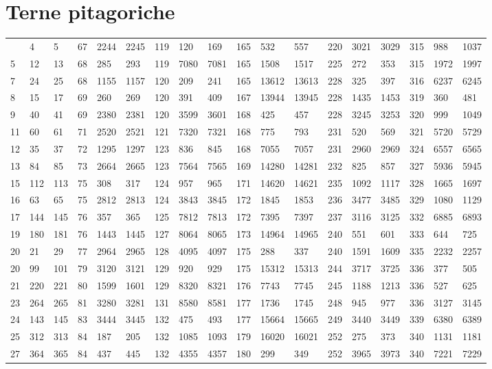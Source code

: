 \section{Terne pitagoriche}
\begin{center}
\footnotesize
\begin{longtable}{*5{A@{\hspace*{5mm}}A}}
	\toprule\endhead
\bottomrule {}&4&5&67&2244&2245&119&120&169&165&532&557&220&3021&3029&315&988&1037\\
5&12&13&68&285&293&119&7080&7081&165&1508&1517&225&272&353&315&1972&1997\\
7&24&25&68&1155&1157&120&209&241&165&13612&13613&228&325&397&316&6237&6245\\
8&15&17&69&260&269&120&391&409&167&13944&13945&228&1435&1453&319&360&481\\
9&40&41&69&2380&2381&120&3599&3601&168&425&457&228&3245&3253&320&999&1049\\
11&60&61&71&2520&2521&121&7320&7321&168&775&793&231&520&569&321&5720&5729\\
12&35&37&72&1295&1297&123&836&845&168&7055&7057&231&2960&2969&324&6557&6565\\
13&84&85&73&2664&2665&123&7564&7565&169&14280&14281&232&825&857&327&5936&5945\\
15&112&113&75&308&317&124&957&965&171&14620&14621&235&1092&1117&328&1665&1697\\
16&63&65&75&2812&2813&124&3843&3845&172&1845&1853&236&3477&3485&329&1080&1129\\
17&144&145&76&357&365&125&7812&7813&172&7395&7397&237&3116&3125&332&6885&6893\\
19&180&181&76&1443&1445&127&8064&8065&173&14964&14965&240&551&601&333&644&725\\
20&21&29&77&2964&2965&128&4095&4097&175&288&337&240&1591&1609&335&2232&2257\\
20&99&101&79&3120&3121&129&920&929&175&15312&15313&244&3717&3725&336&377&505\\
21&220&221&80&1599&1601&129&8320&8321&176&7743&7745&245&1188&1213&336&527&625\\
23&264&265&81&3280&3281&131&8580&8581&177&1736&1745&248&945&977&336&3127&3145\\
24&143&145&83&3444&3445&132&475&493&177&15664&15665&249&3440&3449&339&6380&6389\\
25&312&313&84&187&205&132&1085&1093&179&16020&16021&252&275&373&340&1131&1181\\
27&364&365&84&437&445&132&4355&4357&180&299&349&252&3965&3973&340&7221&7229\\

\end{longtable}
\end{center}
